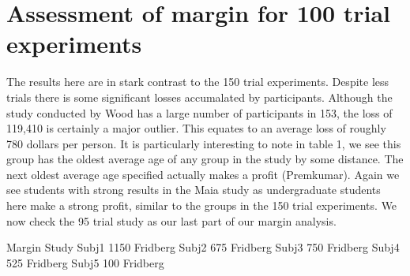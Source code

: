 \documentclass[letterpaper,10pt,english]{jupyterBook}
\begin{document}
\section{Assessment of margin for 100 trial experiments}
\label{\detokenize{data-analysis:assessment-of-margin-for-100-trial-experiments}}
\sphinxAtStartPar
The results here are in stark contrast to the 150 trial experiments. Despite less trials there is some significant losses accumalated by participants. Although the study conducted by Wood has a large number of participants in 153, the loss of 119,410 is certainly a major outlier. This equates to an average loss of roughly 780 dollars per person. It is particularly interesting to note  in table 1, we see this group has the oldest average age of any group in the study by some distance. The next oldest average age specified actually makes a profit (Premkumar). Again we see students with strong results in the Maia study as undergraduate students here make a strong profit, similar to the groups in the 150 trial experiments. We now check the 95 trial study as our last part of our margin analysis.

\begin{sphinxVerbatim}[commandchars=\\\{\}]
\end{sphinxVerbatim}

\begin{sphinxVerbatim}[commandchars=\\\{\}]
        Margin     Study
Subj\PYGZus{}1    1150  Fridberg
Subj\PYGZus{}2    \PYGZhy{}675  Fridberg
Subj\PYGZus{}3    \PYGZhy{}750  Fridberg
Subj\PYGZus{}4    \PYGZhy{}525  Fridberg
Subj\PYGZus{}5     100  Fridberg
\end{sphinxVerbatim}

\begin{sphinxVerbatim}[commandchars=\\\{\}]
\PYG{p}{[}\PYG{p}{[}\PYG{p}{]}   \PYG{p}{]}
\end{sphinxVerbatim}
\end{document}
